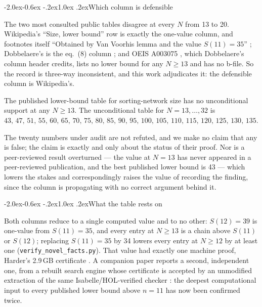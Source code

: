 \documentclass[11pt,a4paper]{article}
\makeatletter
\renewenvironment{quote}{\begin{oldquote}\small}{\end{oldquote}}
\renewcommand\subsection{\@startsection{subsection}{2}{\z@}%
  {-2.0ex\@plus -0.6ex \@minus -.2ex}{1.0ex \@plus .2ex}{\normalfont\normalsize\bfseries}}
\makeatother
\begin{document}
\subsection{Which column is defensible}

The two most consulted public tables disagree at every $N$ from 13 to 20.
Wikipedia's ``Size, lower bound'' row is exactly the one-value column, and
footnotes itself ``Obtained by Van Voorhis lemma and the value $S(11) = 35$''
\cite{Wik26}; Dobbelaere's is the eq.~(8) column \cite{Do25}; and OEIS A003075
\cite{OEIS}, which Dobbelaere's column header credits, lists no lower bound for
any $N \ge 13$ and has no b-file. So the record is three-way inconsistent, and
this work adjudicates it: the defensible column is Wikipedia's.

\begin{quote}
The published lower-bound table for sorting-network size has no unconditional
support at any $N \ge 13$. The unconditional table for $N = 13,\dots,32$ is\\
$43,\, 47,\, 51,\, 55,\, 60,\, 65,\, 70,\, 75,\, 80,\, 85,\, 90,\, 95,\,
100,\, 105,\, 110,\, 115,\, 120,\, 125,\, 130,\, 135$.
\end{quote}

\noindent
The twenty numbers under audit are not refuted, and we make no claim that any is
false; the claim is exactly and only about the status of their proof. Nor is a
peer-reviewed result overturned --- the value at $N = 13$ has never appeared in
a peer-reviewed publication, and the best published lower bound is 43 --- which
lowers the stakes and correspondingly raises the value of recording the finding,
since the column is propagating with no correct argument behind it.

\subsection{What the table rests on}

Both columns reduce to a single computed value and to no other: $S(12) = 39$ is
one-value from $S(11) = 35$, and every entry at $N \ge 13$ is a chain above
$S(11)$ or $S(12)$; replacing $S(11) = 35$ by 34 lowers every entry at
$N \ge 12$ by at least one (\texttt{verify\_novel\_facts.py}). That value had
exactly one machine proof, Harder's 2.9\,GB certificate \cite{HaCert}. A
companion paper reports a second, independent one, from a rebuilt search engine
whose certificate is accepted by an unmodified extraction of the same
Isabelle/HOL-verified checker \cite{P2,Cert}: the deepest computational input to
every published lower bound above $n = 11$ has now been confirmed twice.
\end{document}
